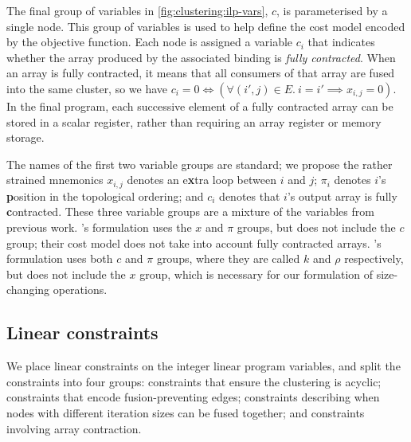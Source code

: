 
The final group of variables in \cref{fig:clustering:ilp-vars}, $c$, is parameterised by a single node.
This group of variables is used to help define the cost model encoded by the objective function.
Each node is assigned a variable $c_i$ that indicates whether the array produced by the associated binding is \emph{fully contracted}.
When an array is fully contracted, it means that all consumers of that array are fused into the same cluster, so we have $c_i = 0 \iff (\forall (i',j) \in E.\ i = i' \implies x_{i,j} = 0)$.
In the final program, each successive element of a fully contracted array can be stored in a scalar register, rather than requiring an array register or memory storage. 

The names of the first two variable groups are standard; we propose the rather strained mnemonics $x_{i,j}$ denotes an e{\bf x}tra loop between $i$ and $j$; $\pi_i$ denotes $i$'s {\bf p}osition in the topological ordering; and $c_i$ denotes that $i$'s output array is fully {\bf c}ontracted.
These three variable groups are a mixture of the variables from previous work.
\citet{megiddo1998optimal}'s formulation uses the $x$ and $\pi$ groups, but does not include the $c$ group; their cost model does not take into account fully contracted arrays.
\citet{darte2002contraction}'s formulation uses both $c$ and $\pi$ groups, where they are called $k$ and $\rho$ respectively, but does not include the $x$ group, which is necessary for our formulation of size-changing operations.


\subsection{Linear constraints}
\label{clustering:s:LinearConstraints}
We place linear constraints on the integer linear program variables, and split the constraints into four groups: constraints that ensure the clustering is acyclic; constraints that encode fusion-preventing edges; constraints describing when nodes with different iteration sizes can be fused together; and constraints involving array contraction. 

